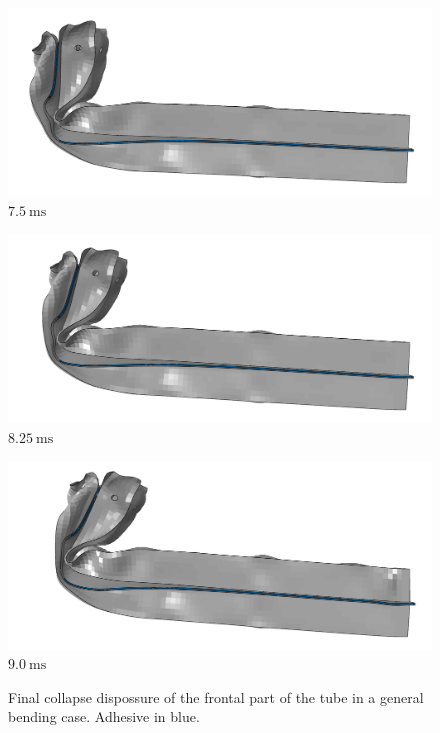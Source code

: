 \documentclass[
documentsize = a4, %
font = cmr, %
typesize = 11, %
printmode = true,
onehalfspacing = true,
language = en, %
titlepage = udciccp, %
degree = pt, %
dedication = true,
acknowledgements = true,
abstract-en = true,
abstract-es = false,
abstract-ga = false,
epigraphs = true,
toc = true,
lof = true,
lot = true,
frontmatterintoc = false,
notation = false,
minimal = false,
]{UDCthesis}
\begin{document}
\begin{figure}
	\centering
	\begin{minipage}[b]{.3\linewidth}
		\centering
		\includegraphics[width=\linewidth]{IMG_CUTRES/b1}
		$\SI{7.5}{\ms}$
	\end{minipage}
	\quad
	\begin{minipage}[b]{.3\linewidth}
		\centering
		\includegraphics[width=\linewidth]{IMG_CUTRES/b2}
		$\SI{8.25}{\ms}$
	\end{minipage}
	\quad
	\begin{minipage}[b]{.3\linewidth}
		\centering
		\includegraphics[width=\linewidth]{IMG_CUTRES/b3}
		$\SI{9.0}{\ms}$
	\end{minipage}
	\caption[Final collapse dispossure of the frontal part of the tube in a general bending case.]{Final collapse dispossure of the frontal part of the tube in a general bending case. Adhesive in blue.}
	\label{fig:gen_bend_weakening}
\end{figure}
\end{document}

